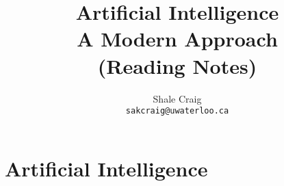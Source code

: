 \ifdefined\isphone
  
\else
  
\fi




\title{Artificial Intelligence \\ A Modern Approach \\ (Reading Notes)}

\author{
    Shale Craig\\
    \texttt{sakcraig@uwaterloo.ca}
}

\maketitle

\tableofcontents

\part{Artificial Intelligence}




